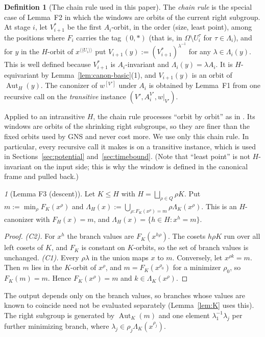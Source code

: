 \documentclass[11pt]{article}
\theoremstyle{plain}
\theoremstyle{definition}
\newtheorem{definition}[theorem]{Definition}
\theoremstyle{remark}
\theoremstyle{named}
\newtheorem*{named}{}
\theoremstyle{namedrm}
\newcommand{\Aut}{\operatorname{Aut}}
\newcommand{\win}[2]{#1^{[#2]}}
\newcommand{\lay}[2]{#1^{\langle\!\langle #2\rangle\!\rangle}}
\begin{document}
\begin{definition}[The chain rule used in this paper]\label{def:chain}
The \emph{chain rule} is the special case of Lemma~F2 in which the windows are orbits of the current
right subgroup. At stage $i$, let $V^*_{i+1}$ be the first $A_i$-orbit, in the order (size, least point),
among the positions where $F_i$ carries the tag $(0,*)$ (that is, in $\Omega\setminus U_i^{\tau}$ for
$\tau\in\Lambda_i$), and for $y$ in the $H$-orbit of $\lay{x}{U_i}$ put
$V_{i+1}(y):=(V^*_{i+1})^{\lambda^{-1}}$ for any $\lambda\in\Lambda_i(y)$. This is well defined because $V^*_{i+1}$
is $A_i$-invariant and $\Lambda_i(y)=\lambda A_i$. It is $H$-equivariant by
Lemma~\ref{lem:canon-basic}(1), and $V_{i+1}(y)$ is an orbit of $\Aut_H(y)$. The canonizer of
$\win{w}{V'}$ under $A_i$ is obtained by Lemma~F1 from one recursive call on the \emph{transitive}
instance $(V',A_i^{V'},w|_{V'})$.
\end{definition}

Applied to an intransitive $H$, the chain rule processes ``orbit by orbit'' as in \cite[Alg.~1]{GNS}.
Its windows are orbits of the shrinking right subgroups, so they are finer than the fixed orbits used by
GNS and never cost more. We use only this chain rule. In particular, every recursive call it makes is on
a transitive instance, which is used in Sections~\ref{sec:potential} and~\ref{sec:timebound}. (Note
that ``least point'' is not $H$-invariant on the input side; this is why the window is defined in the
canonical frame and pulled back.)

\begin{named}[Lemma F3 (descent)]
Let $K\le H$ with $H=\bigsqcup_{\rho\in Q}\rho K$. Put $m:=\min_\rho F_K(x^\rho)$ and
$\Lambda_H(x):=\bigcup_{\rho:F_K(x^\rho)=m}\rho\Lambda_K(x^\rho)$. This is an $H$-canonizer with $F_H(x)=m$,
and $\Lambda_H(x)=\{h\in H:x^h=m\}$.
\end{named}
\begin{proof}
\emph{(C2).} For $x^h$ the branch values are $F_K(x^{h\rho})$. The cosets $h\rho K$ run over all left
cosets of $K$, and $F_K$ is constant on $K$-orbits, so the set of branch values is unchanged.
\emph{(C1).} Every $\rho\lambda$ in the union maps $x$ to $m$. Conversely, let $x^{\rho k}=m$. Then $m$ lies in
the $K$-orbit of $x^\rho$, and $m=F_K(x^{\rho_0})$ for a minimizer $\rho_0$, so $F_K(m)=m$. Hence
$F_K(x^\rho)=m$ and $k\in\Lambda_K(x^\rho)$.
\end{proof}
The output depends only on the branch values, so branches whose values are known to coincide need not
be evaluated separately (Lemma~\ref{lem:K} uses this). The right subgroup is generated by $\Aut_K(m)$ and
one element $\lambda_1^{-1}\lambda_j$ per further minimizing branch, where $\lambda_j\in\rho_j\Lambda_K(x^{\rho_j})$.
\end{document}
